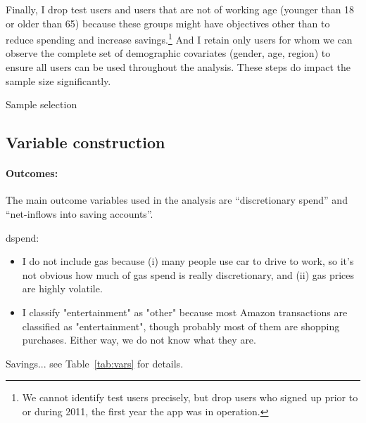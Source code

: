 Finally, I drop test users and users that are not of working age (younger than
18 or older than 65) because these groups might have objectives other than to
reduce spending and increase savings.\footnote{We cannot identify test users
    precisely, but drop users who signed up prior to or during 2011, the first
year the app was in operation.} And I retain only users for whom we can observe
the complete set of demographic covariates (gender, age, region) to ensure all
users can be used throughout the analysis. These steps do impact the sample
size significantly.

\begin{table}
\centering
\caption{Sample selection}\label{tab:selection}

\end{table}


\subsection{Variable construction}%
\label{sub:variable_construction}

\paragraph{Outcomes:}%
\label{par:outcomes}

The main outcome variables used in the analysis are ``discretionary spend'' and
``net-inflows into saving accounts''. 





dspend:
\begin{itemize}
    \item I do not include gas because (i) many people use car to drive to
        work, so it's not obvious how much of gas spend is really
        discretionary, and (ii) gas prices are highly volatile.

    \item I classify "entertainment" as "other" because most Amazon
        transactions are classified as "entertainment", though probably most of
        them are shopping purchases. Either way, we do not know what they are.

\end{itemize}


Savings... see Table~\ref{tab:vars} for details.

